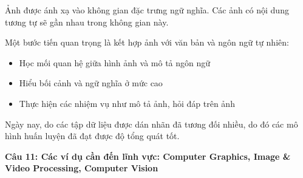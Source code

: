 Ảnh được ánh xạ vào không gian đặc trưng ngữ nghĩa. Các ảnh có nội dung tương tự sẽ gần nhau trong không gian này.

Một bước tiến quan trọng là kết hợp ảnh với văn bản và ngôn ngữ tự nhiên:

\begin{itemize}
	\item Học mối quan hệ giữa hình ảnh và mô tả ngôn ngữ
	
	\item Hiểu bối cảnh và ngữ nghĩa ở mức cao
	
	\item Thực hiện các nhiệm vụ như mô tả ảnh, hỏi đáp trên ảnh
\end{itemize}

Ngày nay, do các tập dữ liệu được dán nhãn đã tương đối nhiều, do đó các mô hình huấn luyện đã đạt được độ tổng quát tốt.

\textbf{Câu 11: Các ví dụ cần đến lĩnh vực: Computer Graphics, Image \& Video Processing, Computer Vision}

